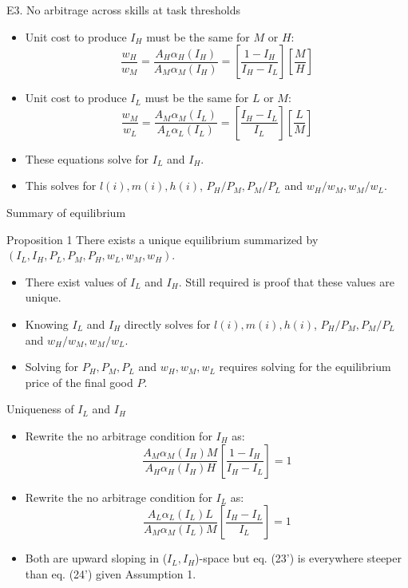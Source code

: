 \documentclass[notes=show]{beamer}
\begin{document}
\begin{frame}{E3. No arbitrage across skills at task thresholds}
\begin{itemize}
\item Unit cost to produce $I_{H}$ must be the same for $M$ or $H$:
\[
\frac{w_{H}}{w_{M}} = \frac{A_{H} \alpha_{H}(I_{H})}{A_{M} \alpha_{M}(I_{H})} = \left[\frac{1-I_{H}}{I_{H}-I_{L}} \right] \left[ \frac{M}{H} \right] \tag{23} \label{eq23}
\]
\item Unit cost to produce $I_{L}$ must be the same for $L$ or $M$:
\[
\frac{w_{M}}{w_{L}}  = \frac{A_{M} \alpha_{M}(I_{L})}{A_{L} \alpha_{L}(I_{L})} = \left[\frac{I_{H}-I_{L}}{I_{L}} \right] \left[ \frac{L}{M} \right]  \tag{24} \label{eq24}
\]
\item These equations solve for $I_{L}$ and $I_{H}$. \medskip
\item This solves for $l(i), m(i), h(i)$, $P_{H}/P_{M}, P_{M}/P_{L}$ and $w_{H}/w_{M}, w_{M}/w_{L}$.
\end{itemize}
\end{frame}

\begin{frame}{Summary of equilibrium}
\begin{block}{Proposition 1}
There exists a unique equilibrium summarized by $(I_{L}, I_{H}, P_{L}, P_{M}, P_{H}, w_{L}, w_{M}, w_{H})$.
\end{block}
\begin{itemize}
\item There exist values of $I_{L}$ and $I_{H}$. Still required is proof that these values are unique. \medskip
\item Knowing $I_{L}$ and $I_{H}$ directly solves for $l(i), m(i), h(i)$, $P_{H}/P_{M}, P_{M}/P_{L}$ and $w_{H}/w_{M}, w_{M}/w_{L}$. \medskip
\item Solving for $P_{H}, P_{M}, P_{L}$ and $w_{H}, w_{M}, w_{L}$ requires solving for the equilibrium price of the final good $P$.
\end{itemize}
\end{frame}

\begin{frame}{Uniqueness of $I_{L}$ and $I_{H}$}
\begin{itemize}
\item Rewrite the no arbitrage condition for $I_{H}$ as:
\[
\frac{A_{M} \alpha_{M}(I_{H})M}{A_{H} \alpha_{H}(I_{H})H} \left[ \frac{1 - I_{H}}{I_{H}-I_{L}} \right] =1 \tag{23'} \label{eq23'}
\]
\item Rewrite the no arbitrage condition for $I_{L}$ as:
\[
\frac{A_{L} \alpha_{L}(I_{L})L}{A_{M} \alpha_{M}(I_{L})M} \left[ \frac{I_{H} - I_{L}}{I_{L}} \right] = 1 \tag{24'} \label{eq24'}
\]
\item Both are upward sloping in ($I_{L}, I_{H}$)-space but eq. (23') is everywhere steeper than eq. (24') given Assumption 1.
\end{itemize}
\end{frame}
\end{document}
